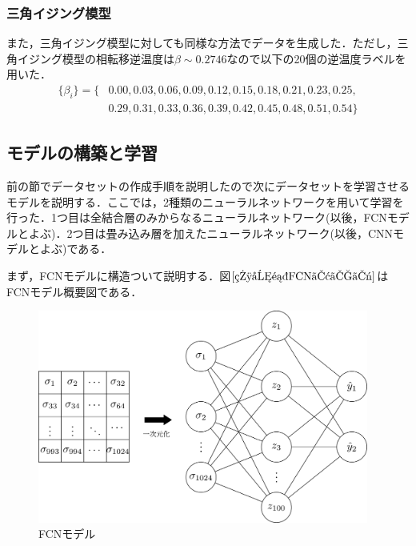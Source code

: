 \documentclass[a4paper,11pt]{jsreport}
\begin{document}
\subsubsection*{三角イジング模型}
また，三角イジング模型に対しても同様な方法でデータを生成した．ただし，三角イジング模型の相転移逆温度は$\beta \sim 0.2746$なので以下の20個の逆温度ラベルを用いた．
\begin{align*}
  \{\beta_i\} 
  = \{ &0.00,0.03,0.06,0.09,0.12,0.15,0.18,0.21,0.23,0.25,\\
  &0.29,0.31,0.33,0.36,0.39,0.42,0.45,0.48,0.51,0.54 \}
\end{align*}

\subsection{モデルの構築と学習}
前の節でデータセットの作成手順を説明したので次にデータセットを学習させるモデルを説明する．ここでは，2種類のニューラルネットワークを用いて学習を行った．1つ目は全結合層のみからなるニューラルネットワーク(以後，FCNモデルとよぶ)．2つ目は畳み込み層を加えたニューラルネットワーク(以後，CNNモデルとよぶ)である．\par
まず，FCNモデルに構造ついて説明する．図$\ref{相分類FCNモデル}$はFCNモデル概要図である．

\begin{figure}[H]
  \begin{center}
      \includegraphics[height=7cm]{image/相分類FCNモデル.png}
      \caption{FCNモデル}
      \label{相分類FCNモデル}
  \end{center}
\end{figure}
\end{document}
